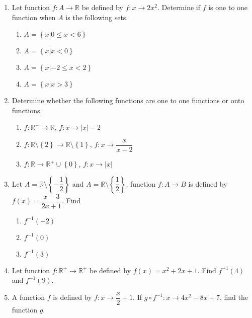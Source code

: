 \documentclass[12pt]{report}
\begin{document}
\begin{enumerate}
          \newpage
    \item Let function $f: A \to \mathbb{R}$ be defined by $f: x \to 2x^2$. Determine if
          $f$ is one to one function when $A$ is the following sets.
          \begin{enumerate}
              \item $A = \left\{x | 0 \leq x < 6\right\}$
              \item $A = \left\{x | x < 0\right\}$
              \item $A = \left\{x | -2 \leq x < 2\right\}$
              \item $A = \left\{x | x > 3\right\}$
          \end{enumerate}

    \item Determine whether the following functions are one to one functions or onto
          functions.
          \begin{enumerate}
              \item $f: \mathbb{R}^+ \to \mathbb{R}$, $f:x \to |x|-2$
              \item $f: \mathbb{R}\setminus\left\{2\right\} \to \mathbb{R}\setminus\left\{1\right\}$, $f:x \to \dfrac{x}{x-2}$
              \item $f: \mathbb{R} \to \mathbb{R}^+\cup\left\{0\right\}$, $f:x \to |x|$
          \end{enumerate}

    \item Let $A = \mathbb{R} \setminus \left\{-\dfrac{1}{2}\right\}$ and $A = \mathbb{R}
              \setminus \left\{\dfrac{1}{2}\right\}$, function $f: A \to B$ is defined by
          $f(x) = \dfrac{x-3}{2x + 1}$. Find
          \begin{enumerate}
              \item $f^{-1}(-2)$
              \item $f^{-1}(0)$
              \item $f^{-1}(3)$
          \end{enumerate}

    \item Let function $f: \mathbb{R}^+ \to \mathbb{R}^+$ be defined by $f(x) = x^2 + 2x
              + 1$. Find $f^{-1}(4)$ and $f^{-1}(9)$.

    \item A function $f$ is defined by $f:x \to \dfrac{x}{2} + 1$. If $g \circ f^{-1}: x
              \to 4x^2 - 8x + 7$, find the function $g$.


\end{enumerate}
\end{document}
